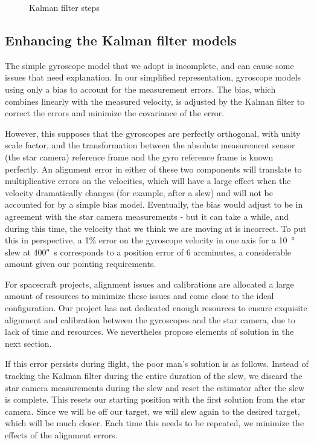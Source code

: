 \begin{figure}[!h]
	\centering
	
\caption{Kalman filter steps}
\label{fig:kalmanFilterSteps}
\end{figure}

\subsection{Enhancing the Kalman filter models}
\label{subsec:enhancedKalman}

The simple gyroscope model that we adopt is incomplete, and can cause some issues that need explanation. In our simplified representation, gyroscope models using only a bias to account for the measurement errors. The bias, which combines linearly with the measured velocity, is adjusted by the Kalman filter to correct the errors and minimize the covariance of the error.

However, this supposes that the gyroscopes are perfectly orthogonal, with unity scale factor, and the transformation between the absolute measurement sensor (the star camera) reference frame and the gyro reference frame is known perfectly. An alignment error in either of these two components will translate to multiplicative errors on the velocities, which will have a large effect when the velocity dramatically changes (for example, after a slew) and will not be accounted for by a simple bias model. Eventually, the bias would adjust to be in agreement with the star camera measurements - but it can take a while, and during this time, the velocity that we think we are moving at is incorrect. To put this in perspective, a 1\% error on the gyroscope velocity in one axis for a \SI{10}{\degree} slew at \ang{;;400}\si{\per\second} corresponds to a position error of 6 arcminutes, a considerable amount given our pointing requirements.

For spacecraft projects, alignment issues and calibrations are allocated a large amount of resources to minimize these issues and come close to the ideal configuration. Our project has not dedicated enough resources to ensure exquisite alignment and calibration between the gyroscopes and the star camera, due to lack of time and resources. We nevertheles propose elements of solution in the next section.

If this error persists during flight, the poor man's solution is as follows. Instead of tracking the Kalman filter during the entire duration of the slew, we discard the star camera measurements during the slew and reset the estimator after the slew is complete. This resets our starting position with the first solution from the star camera. Since we will be off our target, we will slew again to the desired target, which will be much closer. Each time this needs to be repeated, we minimize the effects of the alignment errors.

